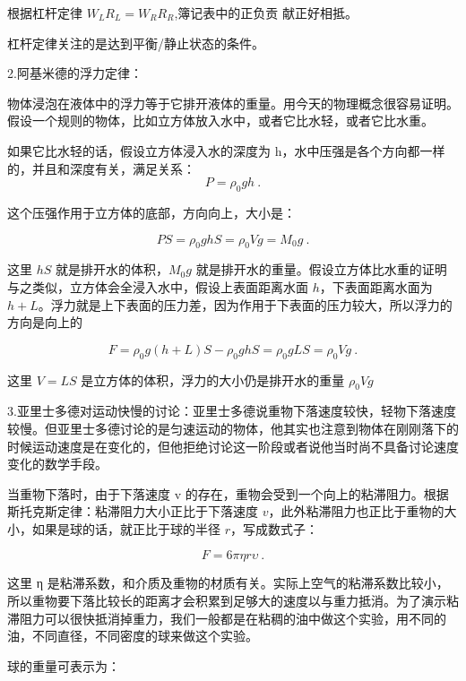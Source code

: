 根据杠杆定律 $W_L R_L=W_R R_R$,簿记表中的正负贡
献正好相抵。

杠杆定律关注的是达到平衡/静⽌状态的条件。


2.阿基米德的浮⼒定律：

物体浸泡在液体中的浮⼒等于它排开液体的重量。用今天的物理概念很容易证明。假设⼀个规则的物体，比如立⽅体放⼊⽔中，或者它比⽔轻，或者它比⽔重。

如果它比⽔轻的话，假设立⽅体浸⼊⽔的深度为 h，⽔中压强是各个⽅向都⼀样的，并且和深度有关，满⾜关系：
\begin{equation}
P = \rho_0 gh~.
\end{equation}

这个压强作用于立方体的底部，方向向上，大小是：

\begin{equation}
PS = \rho_0 gh S = \rho_0 V g = M_0 g~.
\end{equation}

这里 $hS$ 就是排开⽔的体积，$M_0g$ 就是排开⽔的重量。假设立⽅体比⽔重的证明与之类似，立⽅体会全浸⼊⽔中，假设上表面距离⽔面 $h$，下表面距离⽔面为 $h + L$。浮⼒就是上下表面的压⼒差，因为作用于下表面的压⼒较⼤，所以浮⼒的⽅向是向上的

\begin{equation}
F = \rho_0 g(h+L)S -\rho_0 gh S=\rho_0 gLS= \rho_0 V g~.
\end{equation}

这里 $V=LS$ 是立⽅体的体积，浮⼒的⼤小仍是排开⽔的重量 $\rho_0 V g$

3.亚里⼠多德对运动快慢的讨论：亚里⼠多德说重物下落速度较快，轻物下落速度较慢。但亚里⼠多德讨论的是匀速运动的物体，他其实也注意到物体在刚刚落下的时候运动速度是在变化的，但他拒绝讨论这⼀阶段或者说他当时尚不具备讨论速度变化的数学⼿段。

当重物下落时，由于下落速度 v 的存在，重物会受到⼀个向上的粘滞阻⼒。根据斯托克斯定律：粘滞阻⼒⼤小正比于下落速度 $v$，此外粘滞阻⼒也正比于重物的⼤小，如果是球的话，就正比于球的半径 $r$，写成数式⼦：

\begin{equation}
F = 6\pi\eta r \upsilon~.
\end{equation}

这里 η 是粘滞系数，和介质及重物的材质有关。实际上空⽓的粘滞系数比较小，所以重物要下落比较长的距离才会积累到⾜够⼤的速度以与重⼒抵消。为了演示粘滞阻⼒可以很快抵消掉重⼒，我们⼀般都是在粘稠的油中做这个实验，用不同的油，不同直径，不同密度的球来做这个实验。

球的重量可表示为：


